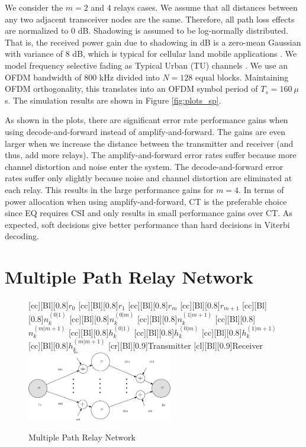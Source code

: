 \documentclass[journal]{IEEEtran}
\begin{document}
We consider the $m = 2$ and $4$ relays cases.  We assume that all distances between any two adjacent transceiver nodes are the same.  Therefore, all path loss effects are normalized to 0 dB.  Shadowing is assumed to be log-normally distributed.  That is, the received power gain due to shadowing in dB is a zero-mean Gaussian with variance of 8 dB, which is typical for cellular land mobile applications \cite{book:Stuber01}.  We model frequency selective fading as Typical Urban (TU) channels \cite{book:Stuber01}.  We use an OFDM bandwidth of 800 kHz divided into $N = 128$ equal blocks.  Maintaining OFDM orthogonality, this translates into an OFDM symbol period of $T_s = 160 \:\mu$s.  The simulation results are shown in Figure \ref{fig:plots_sp}.

As shown in the plots, there are significant error rate
performance gains when using decode-and-forward instead of
amplify-and-forward.  The
gains are even larger when we increase the distance between the
transmitter and receiver (and thus, add more relays).  The
amplify-and-forward error rates suffer because more channel
distortion and noise enter the system.  The decode-and-forward
error rates suffer only slightly because noise and channel
distortion are eliminated at each relay.  This results in the
large performance gains for $m=4$.  In terms of power allocation
when using amplify-and-forward, CT is the preferable choice since
EQ requires CSI and only results in small performance gains over
CT.  As expected, soft decisions give better performance than hard
decisions in Viterbi decoding.

\section{Multiple Path Relay Network}
\label{sec:mp}

\begin{figure}
  \centering
    [cc][Bl][0.8]{$r_0$}
    [cc][Bl][0.8]{$r_1$}
    [cc][Bl][0.8]{$r_m$}
    [cc][Bl][0.8]{$r_{m+1}$}
    [cc][Bl][0.8]{$n_k^{(0|1)}$}
    [cc][Bl][0.8]{$n_k^{(0|m)}$}
    [cc][Bl][0.8]{$n_k^{(1|m+1)}$}
    [cc][Bl][0.8]{$n_k^{(m|m+1)}$}
    [cc][Bl][0.8]{$h_k^{(0|1)}$}
    [cc][Bl][0.8]{$h_k^{(0|m)}$}
    [cc][Bl][0.8]{$h_k^{(1|m+1)}$}
    [cc][Bl][0.8]{$h_k^{(m|m+1)}$}
    [cr][Bl][0.9]{Transmitter}
    [cl][Bl][0.9]{Receiver}
    \includegraphics[width=2.5in]{mp_model.eps}
   \caption{Multiple Path Relay Network \label{fig:mp_sm} }
\end{figure}
\end{document}
